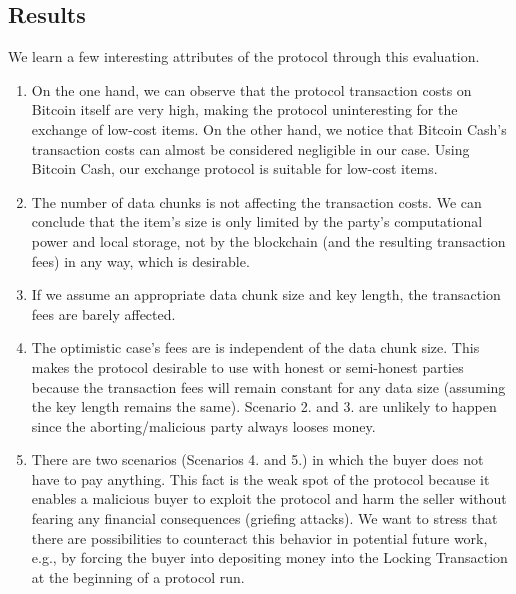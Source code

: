 \documentclass{cacthesis}
\newcounter{protocol}
\begin{document}
	    \subsection{Results}
	    \label{sub:Results}
	    We learn a few interesting attributes of the protocol through this evaluation.
	    
        \begin{enumerate}
        
        \item On the one hand, we can observe that the protocol transaction costs on Bitcoin itself are very high, making the protocol uninteresting for the exchange of low-cost items. On the other hand, we notice that Bitcoin Cash's transaction costs can almost be considered negligible in our case. Using Bitcoin Cash, our exchange protocol is suitable for low-cost items.
        
        \item The number of data chunks is not affecting the transaction costs. We can conclude that the item's size is only limited by the party's computational power and local storage, not by the blockchain (and the resulting transaction fees) in any way, which is desirable.
        
        \item If we assume an appropriate data chunk size and key length, the transaction fees are barely affected. 
        
        \item The optimistic case's fees are is independent of the data chunk size. This makes the protocol desirable to use with honest or semi-honest parties because the transaction fees will remain constant for any data size (assuming the key length remains the same). Scenario 2. and 3. are unlikely to happen since the aborting/malicious party always looses money.
                    
         \item There are two scenarios (Scenarios 4. and 5.) in which the buyer does not have to pay anything. This fact is the weak spot of the protocol because it enables a malicious buyer to exploit the protocol and harm the seller without fearing any financial consequences (griefing attacks). We want to stress that there are possibilities to counteract this behavior in potential future work, e.g., by forcing the buyer into depositing money into the Locking Transaction at the beginning of a protocol run.
         
        \end{enumerate}
	    
\end{document}
